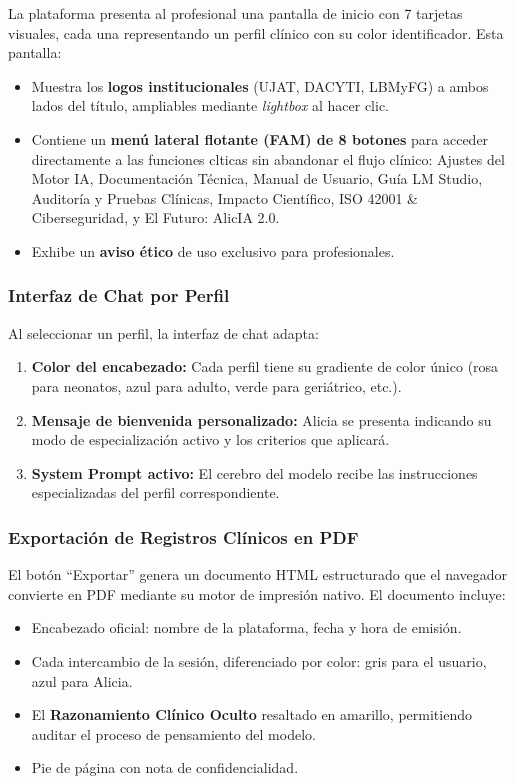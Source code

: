 \documentclass[12pt,a4paper]{article}
\begin{document}
La plataforma presenta al profesional una pantalla de inicio con 7 tarjetas visuales, cada una
representando un perfil clínico con su color identificador. Esta pantalla:

\begin{itemize}
  \item Muestra los \textbf{logos institucionales} (UJAT, DACYTI, LBMyFG) a ambos lados del
    título, ampliables mediante \textit{lightbox} al hacer clic.
  \item Contiene un \textbf{menú lateral flotante (FAM) de 8 botones} para acceder directamente a las funciones clticas sin abandonar el flujo clínico: Ajustes del Motor IA, Documentación Técnica, Manual de Usuario, Guía LM Studio, Auditoría y Pruebas Clínicas, Impacto Científico, ISO 42001 \& Ciberseguridad, y El Futuro: AlicIA 2.0.
  \item Exhibe un \textbf{aviso ético} de uso exclusivo para profesionales.
\end{itemize}

\subsubsection{Interfaz de Chat por Perfil}

Al seleccionar un perfil, la interfaz de chat adapta:
\begin{enumerate}
  \item \textbf{Color del encabezado:} Cada perfil tiene su gradiente de color único (rosa para
    neonatos, azul para adulto, verde para geriátrico, etc.).
  \item \textbf{Mensaje de bienvenida personalizado:} Alicia se presenta indicando su modo de
    especialización activo y los criterios que aplicará.
  \item \textbf{System Prompt activo:} El cerebro del modelo recibe las instrucciones
    especializadas del perfil correspondiente.
\end{enumerate}

\subsubsection{Exportación de Registros Clínicos en PDF}

El botón ``Exportar'' genera un documento HTML estructurado que el navegador convierte en PDF
mediante su motor de impresión nativo. El documento incluye:

\begin{itemize}
  \item Encabezado oficial: nombre de la plataforma, fecha y hora de emisión.
  \item Cada intercambio de la sesión, diferenciado por color: gris para el usuario, azul para
    Alicia.
  \item El \textbf{Razonamiento Clínico Oculto} resaltado en amarillo, permitiendo auditar el
    proceso de pensamiento del modelo.
  \item Pie de página con nota de confidencialidad.
\end{itemize}
\end{document}
